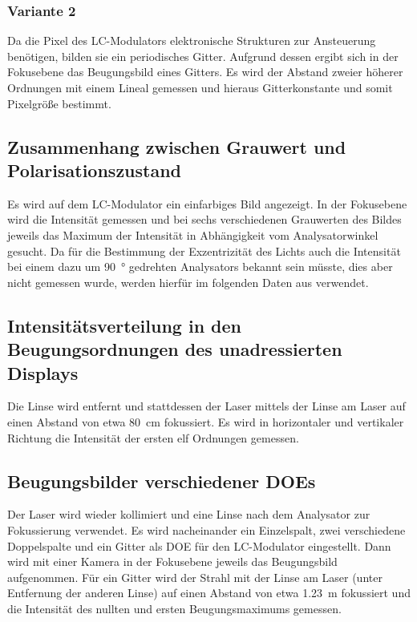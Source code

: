 \documentclass[
	a4paper,
	12pt,
	pagesize,
	ngerman
]{scrartcl}
\begin{document}
		\subsubsection*{Variante 2}
		Da die Pixel des LC-Modulators elektronische Strukturen zur Ansteuerung benötigen, bilden sie ein periodisches Gitter. %
		Aufgrund dessen ergibt sich in der Fokusebene das Beugungsbild eines Gitters.
		Es wird der Abstand zweier höherer Ordnungen mit einem Lineal gemessen und hieraus Gitterkonstante und somit Pixelgröße bestimmt.


	\subsection{Zusammenhang zwischen Grauwert und Polarisationszustand}

		Es wird auf dem LC-Modulator ein einfarbiges Bild angezeigt. %
		In der Fokusebene wird die Intensität gemessen und bei sechs verschiedenen Grauwerten des Bildes jeweils das Maximum der Intensität in Abhängigkeit vom Analysatorwinkel gesucht.
		Da für die Bestimmung der Exzentrizität des Lichts auch die Intensität bei einem dazu um \SI{90}{\degree} gedrehten Analysators bekannt sein müsste, dies aber nicht gemessen wurde, werden hierfür im folgenden Daten aus \cite{JTZ} verwendet.

	\subsection{Intensitätsverteilung in den Beugungsordnungen des unadressierten Displays} %
	Die Linse wird entfernt und stattdessen der Laser mittels der Linse am Laser auf einen Abstand von etwa \SI{80}{\centi \meter} fokussiert. %
	Es wird in horizontaler und vertikaler Richtung die Intensität der ersten elf Ordnungen gemessen. %

	\subsection{Beugungsbilder verschiedener DOEs}
		Der Laser wird wieder kollimiert und eine Linse nach dem Analysator zur Fokussierung verwendet.
		Es wird nacheinander ein Einzelspalt, zwei verschiedene Doppelspalte und ein Gitter als DOE für den LC-Modulator eingestellt.
		Dann wird mit einer Kamera in der Fokusebene jeweils das Beugungsbild aufgenommen.
		Für ein Gitter wird der Strahl mit der Linse am Laser (unter Entfernung der anderen Linse) auf einen Abstand von etwa \SI{1,23}{m} fokussiert und die Intensität des nullten und ersten Beugungsmaximums gemessen.
\end{document}
